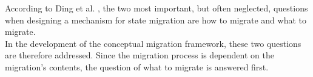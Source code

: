
According to Ding et al. \cite{Ding.15012015}, the two most important, but often neglected, questions when designing a mechanism for state migration are how to migrate and what to migrate.\\
In the development of the conceptual migration framework, these two questions are therefore addressed. Since the migration process is dependent on the migration's contents, the question of what to migrate is answered first.\par

